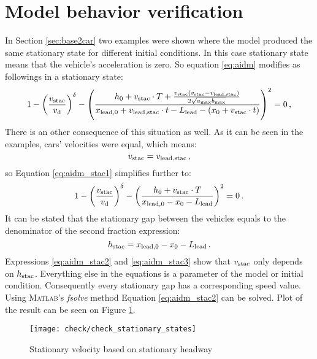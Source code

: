 	\section{Model behavior verification}
		In Section \ref{sec:base2car} two examples were shown where the model produced the same stationary state for different initial conditions. In this case stationary state means that the vehicle's acceleration is zero. So equation \ref{eq:aidm} modifies as followings in a stationary state:
		\begin{equation}
		1 - \left ( \frac{v_{\rm stac}}{v_{\rm d}} \right )^{\rm \delta} - \left ( \frac{h_0+v_{\rm stac}\cdot T+\frac{v_{\rm stac}(v_{\rm stac}-v_{\rm lead,stac})}{2\sqrt{a_{\rm max} b_{\rm max}}}}{x_{\rm lead,0}+v_{\rm lead, stac}\cdot t - L_{\rm lead} - (x_{0} + v_{\rm stac}\cdot t)} \right )^2=0\,,
		\label{eq:aidm_stac1}
		\end{equation}
		There is an other consequence of this situation as well. As it can be seen in the examples, cars' velocities were equal, which means:
		\begin{equation}
			v_{\rm stac}=v_{\rm lead,stac}\,,
		\end{equation}
		so Equation \ref{eq:aidm_stac1} simplifies further to:
		\begin{equation}
			1 - \left ( \frac{v_{\rm stac}}{v_{\rm d}} \right )^{\rm \delta} - \left ( \frac{h_0+v_{\rm stac}\cdot T}{x_{\rm lead,0}-x_{0} - L_{\rm lead}} \right )^2=0\,.
			\label{eq:aidm_stac2}
		\end{equation}
		It can be stated that the stationary gap between the vehicles equals to the denominator of the second fraction expression:
		\begin{equation}
		h_{\rm stac}=x_{\rm lead,0}-x_{0} - L_{\rm lead}\,.
		\label{eq:aidm_stac3}
		\end{equation}
		Expressions \ref{eq:aidm_stac2} and \ref{eq:aidm_stac3} show that $v_{\rm stac}$ only depends on $h_{\rm stac}$. Everything else in the equations is a parameter of the model or initial condition. Consequently every stationary gap has a corresponding speed value. Using \textsc{Matlab}'s \textit{fsolve} method Equation \ref{eq:aidm_stac2} can be solved. Plot of the result can be seen on Figure \ref{fig:aidm_stac}.
		\begin{figure}
			\centering
			\texttt{[image: check/check\_stationary\_states]}
			\caption{Stationary velocity based on stationary headway}
			\label{fig:aidm_stac}
		\end{figure}

